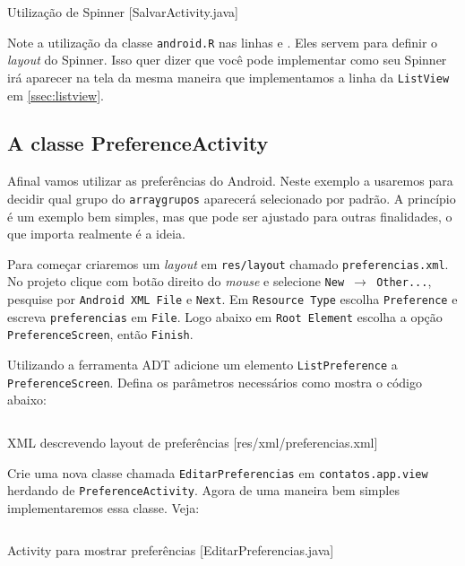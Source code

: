 \begin{listing}[H]
  \inputminted[linenos=true,frame=bottomline,tabsize=3]{ java }{ source/SalvarActivity-6.java }
  \caption{Utilização de Spinner [SalvarActivity.java]}
\end{listing}

Note a utilização da classe \texttt{android.R} nas linhas  e . Eles servem
para definir o \textit{layout} do Spinner. Isso quer dizer que você pode implementar como seu Spinner
irá aparecer na tela da mesma maneira que implementamos a linha da \texttt{ListView} em \ref{ssec:listview}.

\subsection{A classe PreferenceActivity}

Afinal vamos utilizar as preferências do Android. Neste exemplo a usaremos para decidir qual grupo
do \texttt{array\b{ }grupos} aparecerá selecionado por padrão. A princípio é um exemplo bem simples, mas
que pode ser ajustado para outras finalidades, o que importa realmente é a ideia.

Para começar criaremos um \textit{layout} em \texttt{res/layout} chamado \texttt{preferencias.xml}.
No projeto clique com botão direito do \textit{mouse} e selecione \texttt{New $\rightarrow$ Other...},
pesquise por \texttt{Android XML File} e \texttt{Next}. Em \texttt{Resource Type} escolha
\texttt{Preference} e escreva \texttt{preferencias} em \texttt{File}. Logo abaixo em \texttt{Root Element}
escolha a opção \texttt{PreferenceScreen}, então \texttt{Finish}.

Utilizando a ferramenta ADT adicione um elemento \texttt{ListPreference} a \texttt{PreferenceScreen}.
Defina os parâmetros necessários como mostra o código abaixo:

\begin{listing}[H]
  \inputminted[linenos=true,frame=bottomline,tabsize=3]{ xml }{ source/preferencias-1.xml }
  \caption{XML descrevendo layout de preferências [res/xml/preferencias.xml]}
\end{listing}

Crie uma nova classe chamada \texttt{EditarPreferencias} em \texttt{contatos.app.view} herdando de
\texttt{PreferenceActivity}. Agora de uma maneira bem simples implementaremos essa classe. Veja:

\begin{listing}[H]
  \inputminted[linenos=true,frame=bottomline,tabsize=3]{ java }{ source/EditarPreferencias-1.java }
  \caption{Activity para mostrar preferências [EditarPreferencias.java]}
\end{listing}

